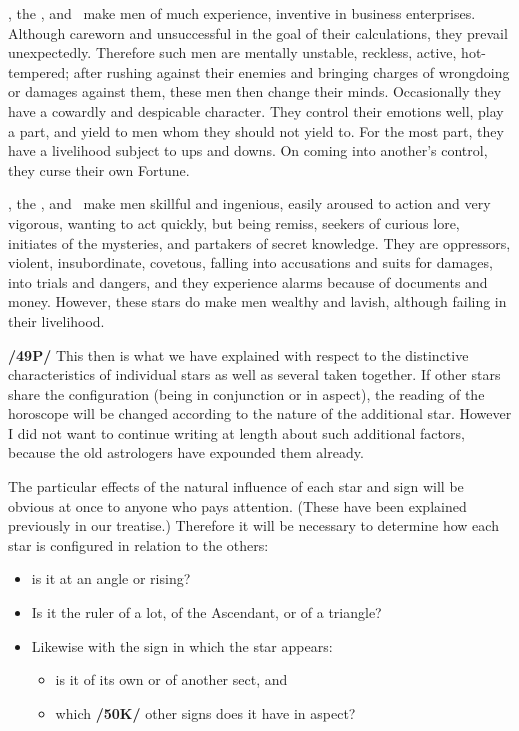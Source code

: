 \Mars, the \Sun, and \Mercury\, make men of much experience, inventive in business enterprises. Although careworn and unsuccessful in the goal of their calculations, they prevail unexpectedly. Therefore such men are mentally unstable, reckless, active, hot-tempered; after rushing against their enemies and bringing charges of wrongdoing or damages against them, these men then change their minds.
Occasionally they have a cowardly and despicable character. They control their emotions well, play a part, and yield to men whom they should not yield to. For the most part, they have a livelihood subject to ups and downs. On coming into another’s control, they curse their own Fortune.

\Mars, the \Moon, and \Mercury\, make men skillful and ingenious, easily aroused to action and very vigorous, wanting to act quickly, but being remiss, seekers of curious lore, initiates of the mysteries, and partakers of secret knowledge. They are oppressors, violent, insubordinate, covetous, falling into accusations and suits for damages, into trials and dangers, and they experience alarms because of documents
and money. However, these stars do make men wealthy and lavish, although failing in their livelihood. 

\textbf{/49P/} This then is what we have explained with respect to the distinctive characteristics of individual stars as well as several taken together. If other stars share the configuration (being in conjunction or in aspect), the reading of the horoscope will be changed according to the nature of the additional star. However I did not want to continue writing at length about such additional factors, because the old astrologers have expounded them already. 

\mndl[0.2cm]
The particular effects of the natural influence of each star and sign will be obvious at once to anyone who pays attention. (These have been explained previously in our treatise.) Therefore it will be necessary to determine how each star is configured in relation to the others: 
\begin{itemize}
\item is it at an angle or rising? 
\item Is it the ruler of a lot, of the Ascendant, or of a triangle? 
\item Likewise with the sign in which the star appears: 
\begin{itemize}
\item is it of its own or of another sect, and 
\item which \textbf{/50K/} other signs does it have in aspect? 
\end{itemize}
\end{itemize}

